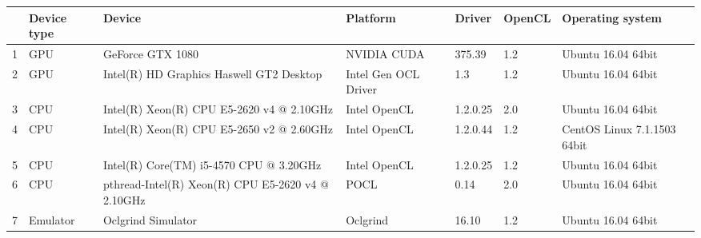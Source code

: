 \begin{tabular}{lllllll}
\toprule
{} & Device type &                                             Device &              Platform &    Driver & OpenCL &             Operating system \\
\midrule
1 &         GPU &                                   GeForce GTX 1080 &           NVIDIA CUDA &    375.39 &    1.2 &           Ubuntu 16.04 64bit \\
2 &         GPU &           Intel(R) HD Graphics Haswell GT2 Desktop &  Intel Gen OCL Driver &       1.3 &    1.2 &           Ubuntu 16.04 64bit \\
3 &         CPU &          Intel(R) Xeon(R) CPU E5-2620 v4 @ 2.10GHz &          Intel OpenCL &  1.2.0.25 &    2.0 &           Ubuntu 16.04 64bit \\
4 &         CPU &          Intel(R) Xeon(R) CPU E5-2650 v2 @ 2.60GHz &          Intel OpenCL &  1.2.0.44 &    1.2 &  CentOS Linux 7.1.1503 64bit \\
5 &         CPU &            Intel(R) Core(TM) i5-4570 CPU @ 3.20GHz &          Intel OpenCL &  1.2.0.25 &    1.2 &           Ubuntu 16.04 64bit \\
6 &         CPU &  pthread-Intel(R) Xeon(R) CPU E5-2620 v4 @ 2.10GHz &                  POCL &      0.14 &    2.0 &           Ubuntu 16.04 64bit \\
7 &    Emulator &                                 Oclgrind Simulator &              Oclgrind &     16.10 &    1.2 &           Ubuntu 16.04 64bit \\
\bottomrule
\end{tabular}
